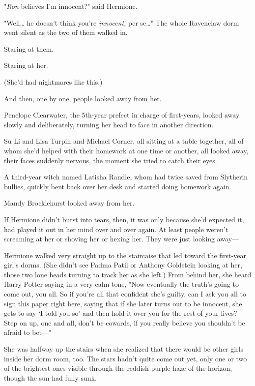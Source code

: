 "\emph{Ron} believes I'm innocent?" said Hermione.

"Well{\ldots} he doesn't think you're \emph{innocent,} per se{\ldots}"
\sbreak
The whole Ravenclaw dorm went silent as the two of them walked in.

Staring at them.

Staring at her.

(She'd had nightmares like this.)

And then, one by one, people looked away from her.

Penelope Clearwater, the 5th-year prefect in charge of first-years, looked away
slowly and deliberately, turning her head to face in another direction.

Su Li and Lisa Turpin and Michael Corner, all sitting at a table together, all
of whom she'd helped with their homework at one time or another, all looked
away, their faces suddenly nervous, the moment she tried to catch their eyes.

A third-year witch named Latisha Randle, whom \SPHEW had twice saved from
Slytherin bullies, quickly bent back over her desk and started doing homework
again.

Mandy Brocklehurst looked away from her.

If Hermione didn't burst into tears, then, it was only because she'd expected
it, had played it out in her mind over and over again. At least people weren't
screaming at her or shoving her or hexing her. They were just looking away---

Hermione walked very straight up to the staircaise that led toward the
first-year girl's dorms. (She didn't see Padma Patil or Anthony Goldstein
looking at her, those two lone heads turning to track her as she left.) From
behind her, she heard Harry Potter saying in a very calm tone, "Now eventually
the truth's going to come out, you all. So if you're all that confident she's
guilty, can I ask you all to sign this paper right here, saying that if she
later turns out to be innocent, she gets to say `I told you so' and then hold
it over you for the rest of your lives? Step on up, one and all, don't be
cowards, if you really believe you shouldn't be afraid to bet---"

She was halfway up the stairs when she realized that there would be other girls
inside her dorm room, too.
\sbreak
The stars hadn't quite come out yet, only one or two of the brightest ones
visible through the reddish-purple haze of the horizon, though the sun had
fully sunk.

